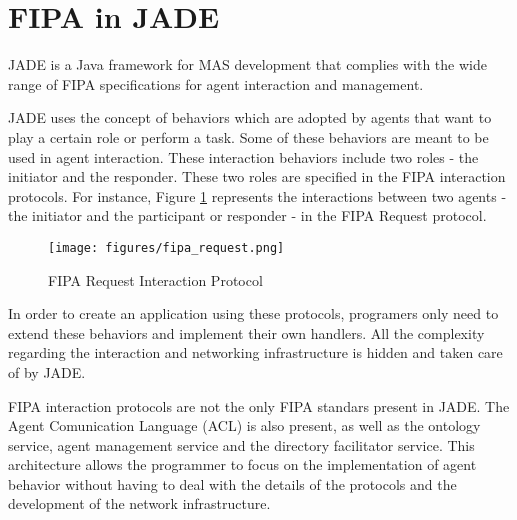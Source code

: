 \section{FIPA in JADE} %
\label{sec:jade}

JADE is a Java framework for MAS development that complies with the wide range of FIPA specifications for agent interaction and management.

JADE uses the concept of behaviors which are adopted by agents that want to play a certain role or perform a task. Some of these behaviors are meant to be used in agent interaction. These interaction behaviors include two roles - the initiator and the responder. These two roles are specified in the FIPA interaction protocols. For instance, Figure \ref{fig:fipa_request} represents the interactions between two agents - the initiator and the participant or responder - in the FIPA Request protocol.

\begin{figure}[h]
	\centering
	\texttt{[image: figures/fipa\_request.png]}
	\caption{FIPA Request Interaction Protocol}
	\label{fig:fipa_request}
\end{figure}

In order to create an application using these protocols, programers only need to extend these behaviors and implement their own handlers. All the complexity regarding the interaction and networking infrastructure is hidden and taken care of by JADE.

FIPA interaction protocols are not the only FIPA standars present in JADE. The Agent Comunication Language (ACL) is also present, as well as the ontology service, agent management service and the directory facilitator service.
This architecture allows the programmer to focus on the implementation of agent behavior without having to deal with the details of the protocols and the development of the network infrastructure. \cite{bellifemine2003jade}
